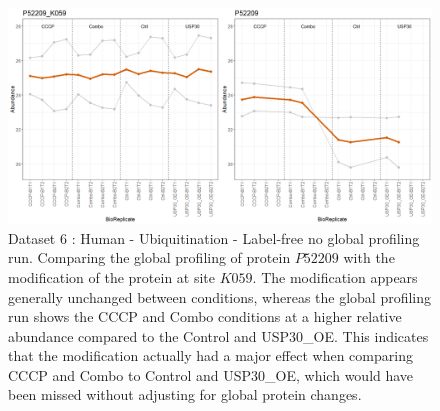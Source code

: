 \documentclass[mcp]{article}
\numberwithin{figure}{section} %
\numberwithin{table}{section}
\begin{document}
\begin{figure}[ht]
\centering
\includegraphics[width=1\textwidth]{images/USP30_profile_plot.png}
\caption{Dataset 6 : Human - Ubiquitination - Label-free no global profiling run. Comparing the global profiling of protein $P52209$ with the modification of the protein at site $K059$. The modification appears generally unchanged between conditions, whereas the global profiling run shows the CCCP and Combo conditions at a higher relative abundance compared to the Control and USP30\_OE. This indicates that the modification actually had a major effect when comparing CCCP and Combo to Control and USP30\_OE, which would have been missed without adjusting for global protein changes.}
\label{fig:usp30_profile}
\end{figure}
\end{document}
